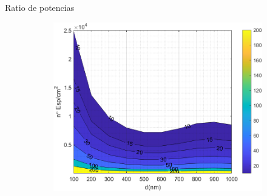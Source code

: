 \documentclass[spanish,a4paper]{beamer}%
\begin{document}
\begin{frame}{Ratio de potencias}
\begin{figure}[h]
\begin{subfigure}[b]{0.48\textwidth}
				\end{subfigure}\hfill
				\begin{subfigure}[b]{0.48\textwidth}\centering
					\includegraphics[width=.8\textwidth]{SS_Rc}%
				\end{subfigure}
			\label{SsSiO2Ge_rel}%
			\end{figure}	
	\end{frame}
	
\end{document}
